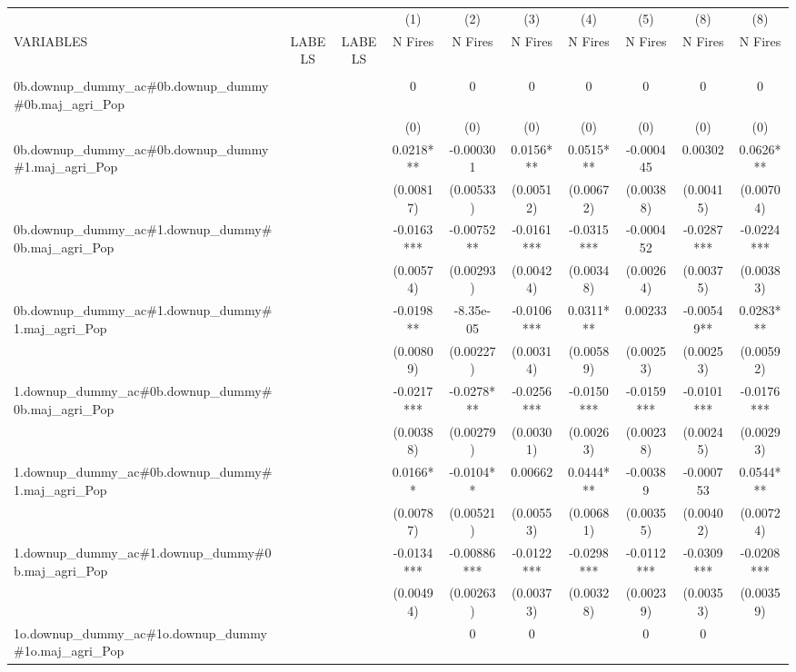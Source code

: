 \documentclass[]{article}
\begin{document}
\begin{tabular}{lccccccccc} \hline
 &  &  & (1) & (2) & (3) & (4) & (5) & (8) & (8) \\
VARIABLES & LABELS & LABELS & N Fires & N Fires & N Fires & N Fires & N Fires & N Fires & N Fires \\ \hline
 &  &  &  &  &  &  &  &  &  \\
0b.downup\_dummy\_ac\#0b.downup\_dummy\#0b.maj\_agri\_Pop &  &  & 0 & 0 & 0 & 0 & 0 & 0 & 0 \\
 &  &  & (0) & (0) & (0) & (0) & (0) & (0) & (0) \\
0b.downup\_dummy\_ac\#0b.downup\_dummy\#1.maj\_agri\_Pop &  &  & 0.0218*** & -0.000301 & 0.0156*** & 0.0515*** & -0.000445 & 0.00302 & 0.0626*** \\
 &  &  & (0.00817) & (0.00533) & (0.00512) & (0.00672) & (0.00388) & (0.00415) & (0.00704) \\
0b.downup\_dummy\_ac\#1.downup\_dummy\#0b.maj\_agri\_Pop &  &  & -0.0163*** & -0.00752** & -0.0161*** & -0.0315*** & -0.000452 & -0.0287*** & -0.0224*** \\
 &  &  & (0.00574) & (0.00293) & (0.00424) & (0.00348) & (0.00264) & (0.00375) & (0.00383) \\
0b.downup\_dummy\_ac\#1.downup\_dummy\#1.maj\_agri\_Pop &  &  & -0.0198** & -8.35e-05 & -0.0106*** & 0.0311*** & 0.00233 & -0.00549** & 0.0283*** \\
 &  &  & (0.00809) & (0.00227) & (0.00314) & (0.00589) & (0.00253) & (0.00253) & (0.00592) \\
1.downup\_dummy\_ac\#0b.downup\_dummy\#0b.maj\_agri\_Pop &  &  & -0.0217*** & -0.0278*** & -0.0256*** & -0.0150*** & -0.0159*** & -0.0101*** & -0.0176*** \\
 &  &  & (0.00388) & (0.00279) & (0.00301) & (0.00263) & (0.00238) & (0.00245) & (0.00293) \\
1.downup\_dummy\_ac\#0b.downup\_dummy\#1.maj\_agri\_Pop &  &  & 0.0166** & -0.0104** & 0.00662 & 0.0444*** & -0.00389 & -0.000753 & 0.0544*** \\
 &  &  & (0.00787) & (0.00521) & (0.00553) & (0.00681) & (0.00355) & (0.00402) & (0.00724) \\
1.downup\_dummy\_ac\#1.downup\_dummy\#0b.maj\_agri\_Pop &  &  & -0.0134*** & -0.00886*** & -0.0122*** & -0.0298*** & -0.0112*** & -0.0309*** & -0.0208*** \\
 &  &  & (0.00494) & (0.00263) & (0.00373) & (0.00328) & (0.00239) & (0.00353) & (0.00359) \\
1o.downup\_dummy\_ac\#1o.downup\_dummy\#1o.maj\_agri\_Pop &  &  &  & 0 & 0 &  & 0 & 0 &  \\

\end{tabular}
\end{document}
